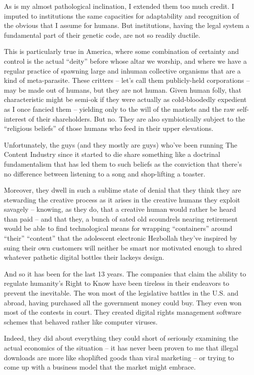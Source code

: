 As is my almost pathological inclination, I extended them too much
credit. I imputed to institutions the same capacities for
adaptability and recognition of the obvious that I assume for
humans. But institutions, having the legal system a fundamental
part of their genetic code, are not so readily ductile.

This is particularly true in America, where some combination of
certainty and control is the actual ``deity'' before whose altar we
worship, and where we have a regular practice of spawning large and
inhuman collective organisms that are a kind of meta-parasite.
These critters -- let's call them publicly-held corporations -- may
be made out of humans, but they are not human. Given human folly,
that characteristic might be semi-ok if they were actually as
cold-bloodedly expedient as I once fancied them -- yielding only to
the will of the markets and the raw self-interest of their
shareholders. But no. They are also symbiotically subject to the
``religious beliefs'' of those humans who feed in their upper
elevations.

Unfortunately, the guys (and they mostly are guys) who've been
running The Content Industry since it started to die share
something like a doctrinal fundamentalism that has led them to such
beliefs as the conviction that there's no difference between
listening to a song and shop-lifting a toaster.

Moreover, they dwell in such a sublime state of denial that they
think they are stewarding the creative process as it arises in the
creative humans they exploit savagely -- knowing, as they do, that a
creative human would rather be heard than paid -- and that they, a
bunch of sated old scoundrels nearing retirement would be able to
find technological means for wrapping ``containers'' around ``their''
``content'' that the adolescent electronic Hezbollah they've inspired
by suing their own customers will neither be smart nor motivated
enough to shred whatever pathetic digital bottles their lackeys
design.

And so it has been for the last 13 years. The companies that claim
the ability to regulate humanity's Right to Know have been tireless
in their endeavors to prevent the inevitable. The won most of the
legislative battles in the U.S. and abroad, having purchased all
the government money could buy. They even won most of the contests
in court. They created digital rights management software schemes
that behaved rather like computer viruses.

Indeed, they did about everything they could short of seriously
examining the actual economics of the situation -- it has never been
proven to me that illegal downloads are more like shoplifted goods
than viral marketing -- or trying to come up with a business model
that the market might embrace.

